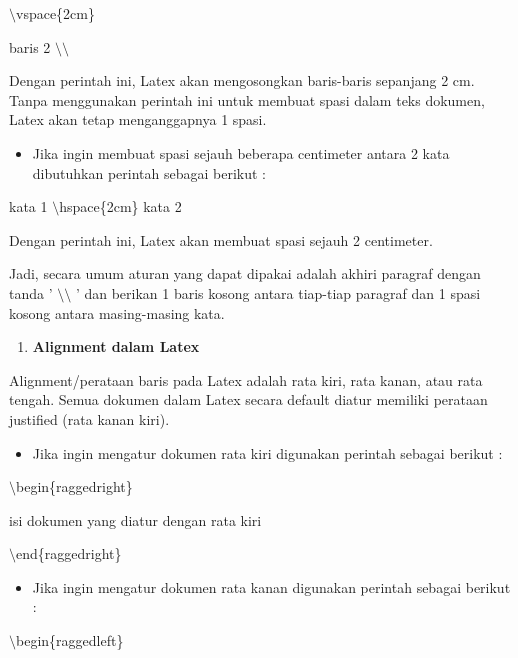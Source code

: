 $\setminus$vspace\{2cm\}

baris 2 $\setminus$$\setminus$

\par \vspace{12pt}

Dengan perintah ini, Latex akan mengosongkan baris-baris sepanjang 2 cm. Tanpa menggunakan perintah ini untuk membuat spasi dalam teks dokumen, Latex akan tetap menganggapnya 1 spasi.

\begin{itemize}
\item Jika ingin membuat spasi sejauh beberapa centimeter antara 2 kata dibutuhkan perintah sebagai berikut :
\end{itemize}
\hspace{0,5in}kata 1 $\setminus$hspace\{2cm\} kata 2\par \vspace{12pt}

Dengan perintah ini, Latex akan membuat spasi sejauh 2 centimeter.

Jadi, secara umum aturan yang dapat dipakai adalah akhiri paragraf dengan tanda ' $\setminus$$\setminus$ ' dan berikan 1 baris kosong antara tiap-tiap paragraf dan 1 spasi kosong antara masing-masing kata.

\begin{enumerate}
\setcounter{enumi}{\thenumberedCntB}
\item \textbf{Alignment dalam Latex}
\setcounter{numberedCntB}{\theenumi}
\end{enumerate}
\hspace{0,5in}Alignment/perataan baris pada Latex adalah rata kiri, rata kanan, atau rata tengah. Semua dokumen dalam Latex secara default diatur memiliki perataan justified (rata kanan kiri).

\begin{itemize}
\item Jika ingin mengatur dokumen rata kiri digunakan perintah sebagai berikut :
\end{itemize}
\hspace{0,5in}$\setminus$begin\{raggedright\}

\hspace{0,5in}isi dokumen yang diatur dengan rata kiri

\hspace{0,5in}$\setminus$end\{raggedright\}

\begin{itemize}
\item Jika ingin mengatur dokumen rata kanan digunakan perintah sebagai berikut :
\end{itemize}
\hspace{0,5in}$\setminus$begin\{raggedleft\}

